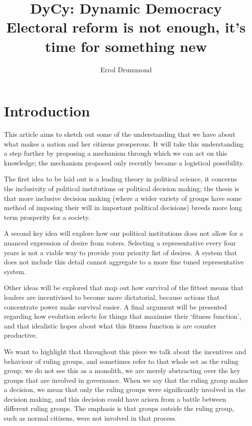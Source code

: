 \documentclass[twoside]{article}
\title{DyCy: Dynamic Democracy \\ \small Electoral reform is not enough, it’s time for something new}
\author{Errol Drummond}
\date{}
\theoremstyle{definition}
\begin{document}
	\maketitle

\section{Introduction}

This article aims to sketch out some of the understanding that we have about what makes a nation and her citizens prosperous. It will take this understanding a step further by proposing a mechanism through which we can act on this knowledge; the mechanism proposed only recently became a logistical possibility.

The first idea to be laid out is a leading theory in political science, it concerns the inclusivity of political institutions or political decision making; the thesis is that more inclusive decision making (where a wider variety of groups have some method of imposing their will in important political decisions) breeds more long term prosperity for a society. 

A second key idea will explore how our political institutions does not allow for a nuanced expression of desire from voters. Selecting a representative every four years is not a viable way to provide your priority list of desires. A system that does not include this detail cannot aggregate to a more fine tuned representative system.

Other ideas will be explored that map out how survival of the fittest means that leaders are incentivised to become more dictatorial, because actions that concentrate power make survival easier. A final argument will be presented regarding how evolution selects for things that maximise their ‘fitness function’, and that idealistic hopes about what this fitness function is are counter productive. 

We want to highlight that throughout this piece we talk about the incentives and behaviour of ruling groups, and sometimes refer to that whole set as the ruling group; we do not see this as a monolith, we are merely abstracting over the key groups that are involved in governance. When we say that the ruling group makes a decision, we mean that only the ruling groups were significantly involved in the decision making, and this decision could have arisen from a battle between different ruling groups. The emphasis is that groups outside the ruling group, such as normal citizens, were not involved in that process.
\end{document}
